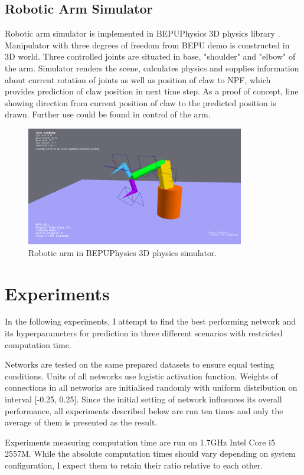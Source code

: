 \documentclass[12pt,oneside]{fithesis2}
\begin{document}
\section{Robotic Arm Simulator}
Robotic arm simulator is implemented in BEPUPhysics 3D physics library \cite{bepuphysics}. Manipulator with three degrees of freedom from BEPU demo is constructed in 3D world. Three controlled joints are situated in base, "shoulder" and "elbow" of the arm. Simulator renders the scene, calculates physics and supplies information about current rotation of joints as well as position of claw to NPF, which provides prediction of claw position in next time step. As a proof of concept, line showing direction from current position of claw to the predicted position is drawn. Further use could be found in control of the arm.
	\begin{figure}[ht]
		\centering
		\includegraphics[width=360px]{roboticarm.png}
		\caption{Robotic arm in BEPUPhysics 3D physics simulator.}
	\end{figure}

\chapter{Experiments}
In the following experiments, I attempt to find the best performing network and its hyperparameters for prediction in three different scenarios with restricted computation time.\par

Networks are tested on the same prepared datasets to ensure equal testing conditions. Units of all networks use logistic activation function. Weights of connections in all networks are initialised randomly with uniform distribution on interval [-0.25, 0.25]. Since the initial setting of network influences its overall performance, all experiments described below are run ten times and only the average of them is presented as the result.\par

Experiments measuring computation time are run on 1.7GHz Intel Core i5 2557M. While the absolute computation times should vary depending on system configuration, I expect them to retain their ratio relative to each other.\par
\end{document}
